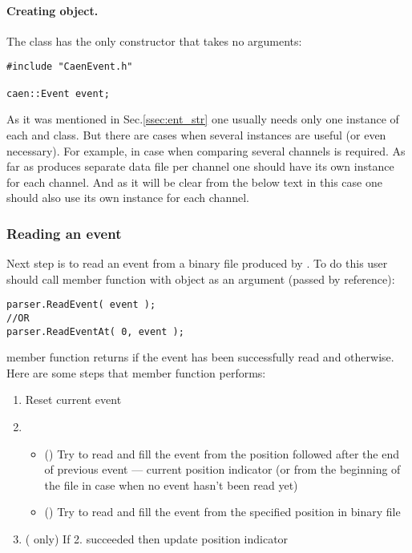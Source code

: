 \paragraph*{Creating  object.}
The  class has the only constructor that takes no arguments:
\begin{lstlisting}
#include "CaenEvent.h"

caen::Event event;
\end{lstlisting}

As it was mentioned in Sec.\ref{ssec:ent_str} one usually needs only one instance of
each  and  class. But there are cases when several instances
are useful (or even necessary). For example, in case when comparing several channels
is required. As far as  produces separate data file per channel one should have
its own  instance for each channel. And as it will be clear from the below
text in this case one should also use its own  instance for each channel.

\subsubsection*{Reading an event}
Next step is to read an event from a binary file produced by . To do this user
should call  member function with  object as an argument
(passed by reference):

\begin{lstlisting}
parser.ReadEvent( event );
//OR
parser.ReadEventAt( 0, event );
\end{lstlisting}

 member function returns  if the event has been
successfully read and  otherwise. Here are some steps that
 member function performs:

\begin{enumerate}
\item Reset current event
\item
    \begin{itemize}
        \item () Try to read and fill the event from the position
followed after the end of previous event --- current position indicator (or from
the beginning of the file in case when no event hasn't been read yet)
        \item () Try to read and fill the event from the
specified position in binary file 
    \end{itemize}
\item ( only) If 2. succeeded then update position indicator
\end{enumerate}

